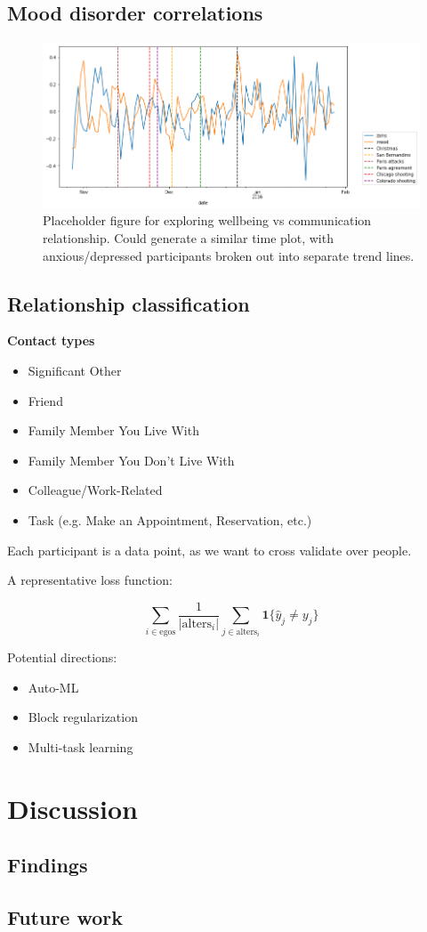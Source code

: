 \documentclass{article}
\begin{document}
\subsection{Mood disorder correlations}

\begin{figure}[H]
    \centering
    \includegraphics[width=\textwidth]{figures/sms_mood_time.png}
    \caption{Placeholder figure for exploring wellbeing vs communication relationship. Could generate a similar time plot, with anxious/depressed participants broken out into separate trend lines.}
\end{figure}
\subsection{Relationship classification}

\textbf{Contact types}
\begin{itemize}
    \item Significant Other
    \item Friend
    \item Family Member You Live With
    \item Family Member You Don't Live With 
    \item Colleague/Work-Related
    \item Task (e.g. Make an Appointment, Reservation, etc.)
\end{itemize}

Each participant is a data point, as we want to cross validate over people.

A representative loss function:

$$
\sum_{i\in\text{egos}} \frac{1}{|\text{alters}_i|} \sum_{j \in \text{alters}_i} \mathbf{1}\{\hat{y}_j \ne y_j\}
$$

Potential directions:
\begin{itemize}
    \item Auto-ML
    \item Block regularization
    \item Multi-task learning
\end{itemize}



\section{Discussion}

\subsection{Findings}

\subsection{Future work}
\nocite{*}


\end{document}
